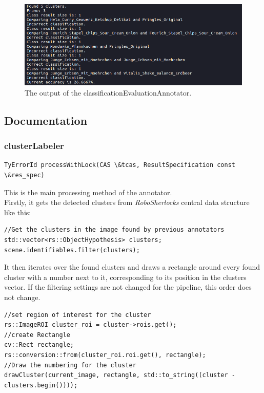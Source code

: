 \documentclass[main.tex]{subfiles}
\begin{document}
\begin{figure}
  \includegraphics[width=\linewidth]{pictures/perception/accuracy.png}
  \caption{The output of the classificationEvaluationAnnotator.}
  \label{fig:classificationEvaluationAnnotator output}
\end{figure}

\subsection{Documentation}
\subsubsection{clusterLabeler}
\begin{lstlisting}
TyErrorId processWithLock(CAS \&tcas, ResultSpecification const \&res_spec)
\end{lstlisting}
This is the main processing method of the annotator.\\

Firstly, it gets the detected clusters from \textit{RoboSherlocks} central data structure like this: \label{getting the detected clusters.}

\begin{lstlisting}
//Get the clusters in the image found by previous annotators
std::vector<rs::ObjectHypothesis> clusters;
scene.identifiables.filter(clusters);
\end{lstlisting}

It then iterates over the found clusters and draws a rectangle around every found cluster with a number next to it, corresponding to its position in the clusters vector. If the filtering settings are not changed for the pipeline, this order does not change.

\begin{lstlisting}
//set region of interest for the cluster
rs::ImageROI cluster_roi = cluster->rois.get();
//create Rectangle
cv::Rect rectangle;
rs::conversion::from(cluster_roi.roi.get(), rectangle);
//Draw the numbering for the cluster
drawCluster(current_image, rectangle, std::to_string((cluster - clusters.begin())));
\end{lstlisting}
\end{document}
